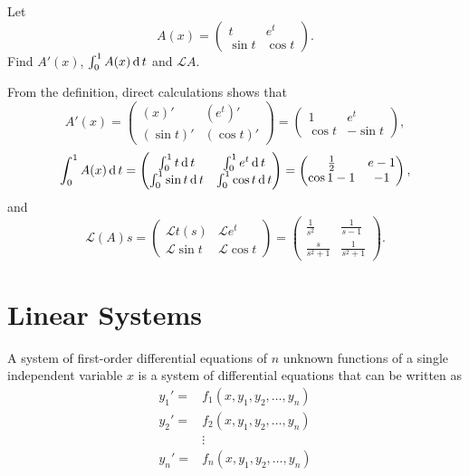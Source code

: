 \begin{example}
  Let 
  \[
  A(x)=\begin{pmatrix}
    t & e^t\\
    \sin t & \cos t
  \end{pmatrix}.  
  \]
  Find $A'(x)$, $\int_0^1 A(x)\operatorname{d} t$ and $\mathcal{L}{A}$.
\end{example}
\begin{solution}
  From the definition, direct calculations shows that
  \[
    A'(x) = \begin{pmatrix}
      (x)' & (e^t)'\\
      (\sin t)' & (\cos t)'
    \end{pmatrix} 
    = \begin{pmatrix}
      1 & e^t\\
      \cos t & -\sin t
    \end{pmatrix},
  \]
  \[
    \int_0^1 A(x)\operatorname{d} t = \begin{pmatrix}
      \int_0^1 t \operatorname{d} t & \int_0^1 e^t\operatorname{d} t\\
      \int_0^1\sin t\operatorname{d} t & \int_0^1\cos t\operatorname{d} t
    \end{pmatrix}  
    =\begin{pmatrix}
      \frac12 & e-1\\
      \cos 1 -1 & -1
    \end{pmatrix},
  \]
  and
  \[
    \mathcal{L}(A)s= \begin{pmatrix}
      \mathcal{L}{t}(s) & \mathcal{L}{e^t}\\
      \mathcal{L}{\sin t} & \mathcal{L}{\cos t}
    \end{pmatrix}  
    =\begin{pmatrix}
      \frac{1}{s^2} & \frac{1}{s-1}\\
      \frac{s}{s^2+1} & \frac{1}{s^2+1}
    \end{pmatrix}.
  \]
\end{solution}


\section{Linear Systems}

A system of first-order differential equations of $n$ unknown functions of a single independent variable $x$ is a system of differential equations that can be written as
\[
  \begin{aligned}
    y_{1}'=&f_{1}\left(x, y_{1}, y_{2}, \ldots, y_{n}\right) \\
    y_{2}'=&f_{2}\left(x, y_{1}, y_{2}, \ldots, y_{n}\right) \\
    & \vdots \\
    y_{n}'=&f_{n}\left(x, y_{1}, y_{2}, \ldots, y_{n}\right)
    \end{aligned}  
\]

